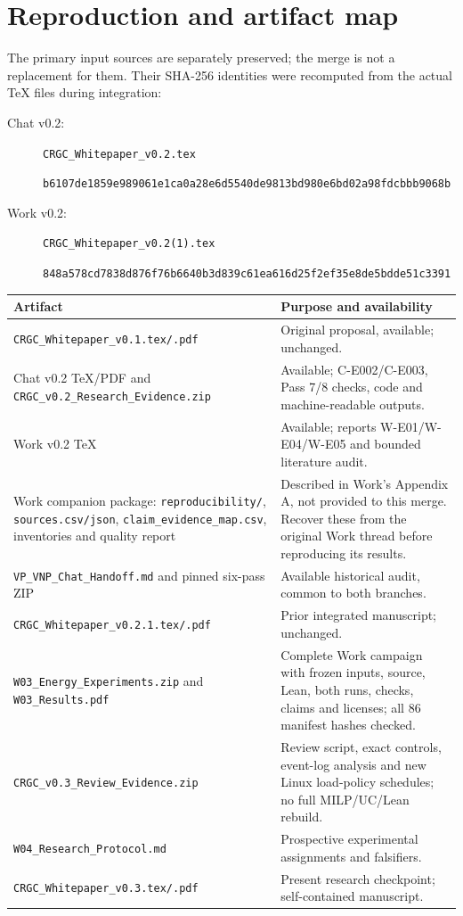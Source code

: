 \documentclass[11pt,letterpaper]{article}
\begin{document}
\section{Reproduction and artifact map}
\label{app:artifacts}
The primary input sources are separately preserved; the merge is not a replacement for them. Their SHA-256 identities were recomputed from the actual TeX files during integration:
\begin{description}
\item[Chat v0.2:] \texttt{CRGC\_Whitepaper\_v0.2.tex}\par\small\texttt{b6107de1859e989061e1ca0a28e6d5540}\newline\texttt{de9813bd980e6bd02a98fdcbbb9068b}\normalsize
\item[Work v0.2:] \texttt{CRGC\_Whitepaper\_v0.2(1).tex}\par\small\texttt{848a578cd7838d876f76b6640b3d839c6}\newline\texttt{1ea616d25f2ef35e8de5bdde51c3391}\normalsize
\end{description}
\begin{longtable}{P{.42\linewidth}P{.49\linewidth}}
\toprule Artifact & Purpose and availability\\\midrule\endhead
\texttt{CRGC\_Whitepaper\_v0.1.tex/.pdf} & Original proposal, available; unchanged.\\
Chat v0.2 TeX/PDF and \texttt{CRGC\_v0.2\_Research\_Evidence.zip} & Available; C-E002/C-E003, Pass 7/8 checks, code and machine-readable outputs.\\
Work v0.2 TeX & Available; reports W-E01/W-E04/W-E05 and bounded literature audit.\\
Work companion package: \texttt{reproducibility/}, \texttt{sources.csv/json}, \texttt{claim\_evidence\_map.csv}, inventories and quality report & Described in Work's Appendix A, not provided to this merge. Recover these from the original Work thread before reproducing its results.\\
\texttt{VP\_VNP\_Chat\_Handoff.md} and pinned six-pass ZIP & Available historical audit, common to both branches.\\
\texttt{CRGC\_Whitepaper\_v0.2.1.tex/.pdf} & Prior integrated manuscript; unchanged.\\
\texttt{W03\_Energy\_Experiments.zip} and \texttt{W03\_Results.pdf} & Complete Work campaign with frozen inputs, source, Lean, both runs, checks, claims and licenses; all 86 manifest hashes checked.\\
\texttt{CRGC\_v0.3\_Review\_Evidence.zip} & Review script, exact controls, event-log analysis and new Linux load-policy schedules; no full MILP/UC/Lean rebuild.\\
\texttt{W04\_Research\_Protocol.md} & Prospective experimental assignments and falsifiers.\\
\texttt{CRGC\_Whitepaper\_v0.3.tex/.pdf} & Present research checkpoint; self-contained manuscript.\\
\bottomrule
\end{longtable}
\end{document}
